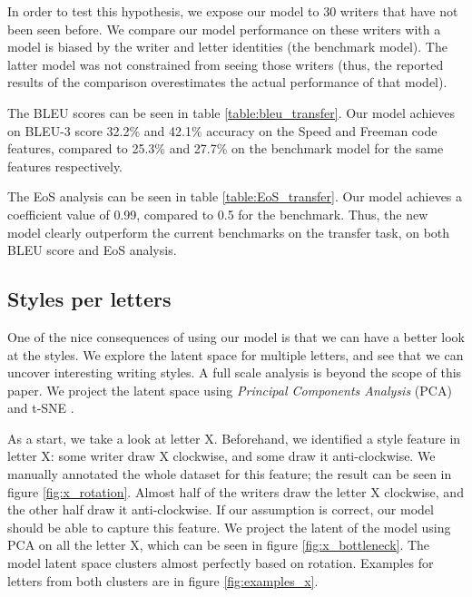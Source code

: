 \documentclass[conference]{IEEEtran}
\begin{document}
\par In order to test this hypothesis, we expose our model to 30 writers that have not been seen before. We compare our model performance on these writers with a model is biased by the writer and letter identities (the benchmark model). The latter model was not constrained from seeing those writers (thus, the reported results of the comparison overestimates the actual performance of that model). 

\par The BLEU scores can be seen in table \ref{table:bleu_transfer}. Our model achieves on BLEU-3 score 32.2\% and 42.1\% accuracy on the Speed and Freeman code features, compared to 25.3\% and 27.7\% on the benchmark model for the same features respectively. 
\par The EoS analysis can be seen in table \ref{table:EoS_transfer}. Our model achieves a coefficient value of 0.99, compared to 0.5 for the benchmark.
Thus, the new model clearly outperform the current benchmarks on the transfer task, on both BLEU score and EoS analysis.

\subsection{Styles per letters}
\par One of the nice consequences of using our model is that we can have a better look at the styles. We explore the latent space for multiple letters, and see that we can uncover interesting writing styles. A full scale analysis is beyond the scope of this paper. We project the latent space using \textit{Principal Components Analysis} (PCA) \cite{jolliffe2011principal} and t-SNE \cite{maaten2008visualizing}.

\par As a start, we take a look at letter X. Beforehand, we identified a style feature in letter X: some writer draw X clockwise, and some draw it anti-clockwise. We manually annotated the whole dataset for this feature; the result can be seen in figure \ref{fig:x_rotation}. Almost half of the writers draw the letter X clockwise, and the other half draw it anti-clockwise. If our assumption is correct, our model should be able to capture this feature. We project the latent  of the model using PCA on all the letter X, which can be seen in figure \ref{fig:x_bottleneck}. The model latent space clusters almost perfectly based on rotation. Examples for letters from both clusters are in figure \ref{fig:examples_x}. 
\end{document}
